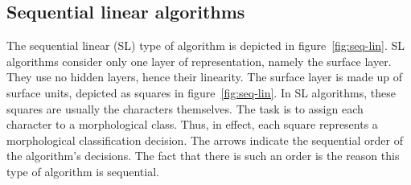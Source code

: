 
\subsection{Sequential linear algorithms}
\label{subsec:seq-lin}

The sequential linear (SL) type of algorithm is depicted in figure~\ref{fig:seq-lin}. 
SL algorithms consider only one layer of representation, namely the surface layer. 
They use no hidden layers, hence their linearity. The surface layer is made up of surface units, depicted as squares in figure~\ref{fig:seq-lin}.
In SL algorithms, these squares are usually the characters themselves. 
The task is to assign each character to a morphological class. Thus, in effect, 
each square represents a morphological classification decision.
The arrows indicate the sequential order of the algorithm's decisions. 
The fact that there is such an order is the reason this type of algorithm is sequential.

